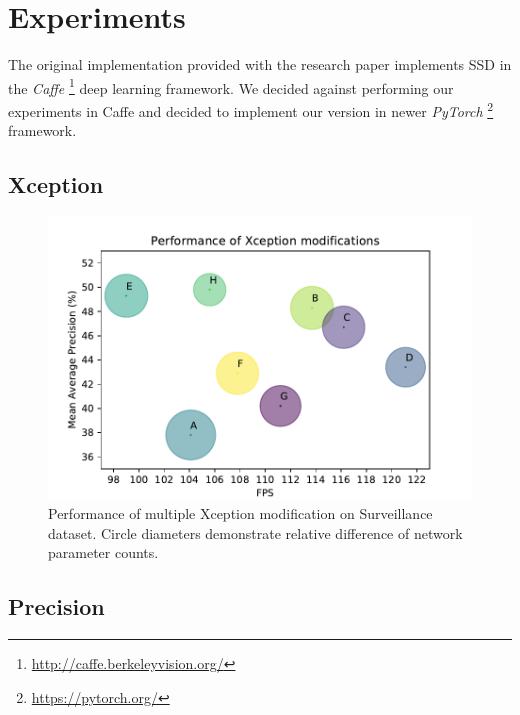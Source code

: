 \chapter{Experiments}

The original implementation provided with the research paper implements SSD in the \textit{Caffe} \footnote{\url{http://caffe.berkeleyvision.org/}} deep learning framework. We decided against performing our experiments in Caffe and decided to implement our version in newer \textit{PyTorch} \footnote{\url{https://pytorch.org/}} framework. 


\section{Xception}

\begin{figure}
    \centering
    \includegraphics[width=\textwidth]{img/fps_map_x}
    \caption[Performance of multiple Xception modification on Surveillance dataset]{Performance of multiple Xception modification on Surveillance dataset. Circle diameters demonstrate relative difference of network parameter counts.} 
    \label{fig:xception_perf}
\end{figure}

\section{Precision}


